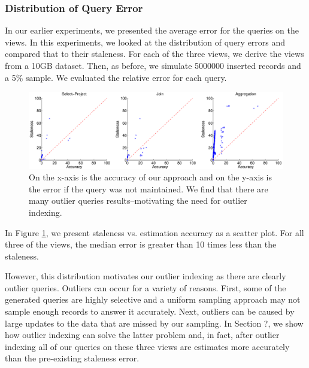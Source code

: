 \subsubsection{Distribution of Query Error}
In our earlier experiments, we presented the average error for the queries on the views.
In this experiments, we looked at the distribution of query errors and compared that to their staleness.
For each of the three views, we derive the views from a 10GB dataset.
Then, as before, we simulate 5000000 inserted records and a 5\% sample.
We evaluated the relative error for each query.

\begin{figure}[ht!]
\label{exp3dist}
\hspace{-2em}
 \includegraphics[scale=0.21]{exp/exp3-query-error-dist.eps}
 \caption{On the x-axis is the accuracy of our approach and on the y-axis is the error if the query was not maintained. We find that there are many outlier queries results--motivating the need for outlier indexing.}
\end{figure}

In Figure \ref{exp3dist}, we present staleness vs. estimation accuracy as a scatter plot.
For all three of the views, the median error is greater than 10 times less than the staleness. 

However, this distribution motivates our outlier indexing as there are clearly outlier queries.
Outliers can occur for a variety of reasons.
First, some of the generated queries are highly selective and a uniform sampling approach may not sample enough records to answer it accurately.
Next, outliers can be caused by large updates to the data that are missed by our sampling.
In Section ?, we show how outlier indexing can solve the latter problem and, in fact, after outlier indexing all of our queries on these three views are estimates more accurately than the pre-existing staleness error.


